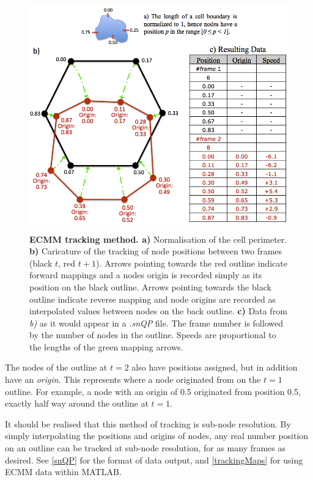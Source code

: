 \documentclass[a4paper,12pt]{article}
\begin{document}
\begin{figure}[ht]
   \centering
   \includegraphics[height=10cm]{ecmm.png}
   \caption{\textbf{ECMM tracking method. a)} Normalisation of the cell perimeter. \textbf{b)} Caricature of the tracking of node positions
   between two frames (black $t$, red $t+1$). Arrows pointing towards the red outline indicate forward mappings and a nodes origin is recorded simply
   as its position on the black outline. Arrows pointing towards the black outline indicate reverse mapping and node origins
   are recorded as interpolated values between nodes on the back outline.
    \textbf{c)} Data from \textit{b)} as it would appear in a \textit{.snQP} file. The frame number is followed by the number of nodes in the outline.
    Speeds are proportional to the lengths of the green mapping arrows.}
   \label{ecmm}
\end{figure}


The nodes of the outline at $t=2$ also have positions assigned, but in addition have an \textit{origin}.  This represents 
where a node originated from on the $t=1$ outline.  For example, a node with an origin of 0.5 originated from 
position 0.5, exactly half way around the outline at $t=1$.

It should be realised that this method of tracking is sub-node resolution.  By simply interpolating the positions and origins of 
nodes, any real number position on an outline can be tracked at sub-node resolution, for as many frames as desired.  See \autoref{snQP} for the format of data output, and \autoref{trackingMaps} for using ECMM data within MATLAB.
\end{document}
